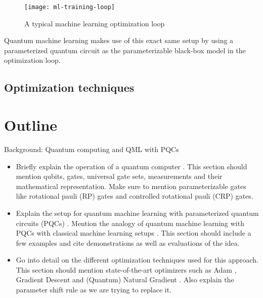 \begin{figure}[h]
    \label{fig:ml-training-loop}
    \centering
    \texttt{[image: ml-training-loop]}
    \caption{A typical machine learning optimization loop}
\end{figure}

Quantum machine learning makes use of this exact same setup by using a
parameterized quantum circuit as the parameterizable black-box model in the
optimization loop.

\subsection{Optimization techniques}

\section{Outline}
Background: Quantum computing and QML with PQCs
\begin{itemize}
    \item
        Briefly explain the operation of a quantum computer
        \cite{nielsen_quantum_2007}.
        This section should mention qubits, gates, universal gate sets,
        measurements and their mathematical representation.
        Make sure to mention parameterizable gates like rotational pauli (RP)
        gates and controlled rotational pauli (CRP) gates.
    \item
        Explain the setup for quantum machine learning with parameterized
        quantum circuits (PQCs) \cite{mitarai_quantum_2018}.
        Mention the analogy of quantum machine learning with PQCs with
        classical machine learning setups \cite{bishop_pattern_2006}.
        This section should include a few examples and cite demonstrations
        as well as evaluations of the idea.
    \item
        Go into detail on the different optimization techniques used for
        this approach.
        This section should mention state-of-the-art optimizers such as
        Adam \cite{kingma_adam_2017}, Gradient Descent and
        (Quantum) Natural Gradient \cite{stokes_quantum_2020}.
        Also explain the parameter shift rule
        \cite{mitarai_quantum_2018,schuld_evaluating_2019} as we are trying
        to replace it.
\end{itemize}
